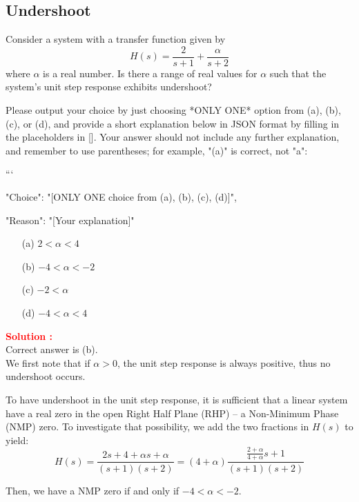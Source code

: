 \documentclass[12pt]{article}
\begin{document}
\subsection{Undershoot}

Consider a system with a transfer function given by
\begin{equation}
H(s) = \frac{2}{s + 1} + \frac{\alpha}{s + 2}
\end{equation}
where \(\alpha\) is a real number. Is there a range of real values for \(\alpha\) such that the system's unit step response exhibits undershoot? 

Please output your choice by just choosing *ONLY ONE* option from (a), (b), (c), or (d), and provide a short explanation below in JSON format by filling in the placeholders in []. Your answer should not include any further explanation, and remember to use parentheses; for example, "(a)" is correct, not "a":

```
{

"Choice": "[ONLY ONE choice from (a), (b), (c), (d)]",

"Reason": "[Your explanation]"

}
\begin{itemize}
    \item[(a)] \(2<\alpha<4\)
    \item[(b)] \(-4<\alpha<-2\)
    \item[(c)] \(-2<\alpha\)
    \item[(d)] \(-4<\alpha<4\)
\end{itemize}
\textbf{\textcolor{red}{Solution :}} \\
Correct answer is (b).\\
We first note that if \(\alpha > 0\), the unit step response is always positive, thus no undershoot occurs. 

To have undershoot in the unit step response, it is sufficient that a linear system have a real zero in the open Right Half Plane (RHP) -- a Non-Minimum Phase (NMP) zero. To investigate that possibility, we add the two fractions in \(H(s)\) to yield:
\begin{equation}
H(s) = \frac{2s + 4 + \alpha s + \alpha}{(s + 1)(s + 2)} = (4+\alpha)\frac{\frac{2 + \alpha}{4 + \alpha}s + 1}{(s + 1)(s + 2)}
\end{equation}

Then, we have a NMP zero if and only if \(-4 < \alpha < -2\).

\clearpage
\end{document}
